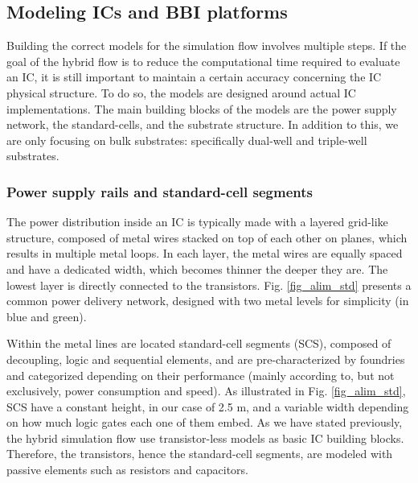 \subsection{Modeling ICs and BBI platforms}
	Building the correct models for the simulation flow involves multiple steps.
	If the goal of the hybrid flow is to reduce the computational time required to evaluate an IC, it is still important to maintain a certain accuracy concerning the IC physical structure.
	To do so, the models are designed around actual IC implementations.
	The main building blocks of the models are the power supply network, the standard-cells, and the substrate structure.
	In addition to this, we are only focusing on bulk substrates: specifically dual-well and triple-well substrates.

	\subsubsection{Power supply rails and standard-cell segments}
		
		The power distribution inside an IC is typically made with a layered grid-like structure, composed of metal wires stacked on top of each other on planes, which results in multiple metal loops.
		In each layer, the metal wires are equally spaced and have a dedicated width, which becomes thinner the deeper they are.
		The lowest layer is directly connected to the transistors.
		Fig. \ref{fig_alim_std} presents a common power delivery network, designed with two metal levels for simplicity (in blue and green).

		Within the metal lines are located standard-cell segments (SCS), composed of decoupling, logic and sequential elements, and are pre-characterized by foundries and categorized depending on their performance (mainly according to, but not exclusively, power consumption and speed).
		As illustrated in Fig. \ref{fig_alim_std}, SCS have a constant height, in our case of 2.5 \textmu m, and a variable width depending on how much logic gates each one of them embed.
		As we have stated previously, the hybrid simulation flow use transistor-less models as basic IC building blocks.
		Therefore, the transistors, hence the standard-cell segments, are modeled with passive elements such as resistors and capacitors.

